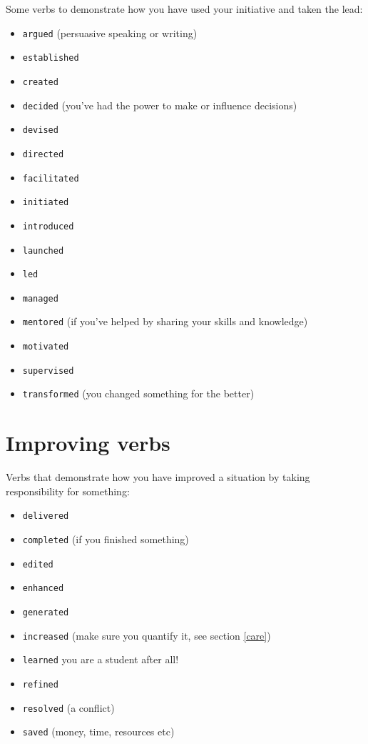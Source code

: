 \documentclass[
]{book}
\providecommand{\tightlist}{%
  \setlength{\itemsep}{0pt}\setlength{\parskip}{0pt}}
\begin{document}
Some verbs to demonstrate how you have used your initiative and taken the lead:

\begin{itemize}
\tightlist
\item
  \texttt{argued} (persuasive speaking or writing)
\item
  \texttt{established}
\item
  \texttt{created}
\item
  \texttt{decided} (you've had the power to make or influence decisions)
\item
  \texttt{devised}
\item
  \texttt{directed}
\item
  \texttt{facilitated}
\item
  \texttt{initiated}
\item
  \texttt{introduced}
\item
  \texttt{launched}
\item
  \texttt{led}
\item
  \texttt{managed}
\item
  \texttt{mentored} (if you've helped by sharing your skills and knowledge)
\item
  \texttt{motivated}
\item
  \texttt{supervised}
\item
  \texttt{transformed} (you changed something for the better)
\end{itemize}

\hypertarget{improving}{%
\section{Improving verbs}\label{improving}}

Verbs that demonstrate how you have improved a situation by taking responsibility for something:

\begin{itemize}
\tightlist
\item
  \texttt{delivered}
\item
  \texttt{completed} (if you finished something)
\item
  \texttt{edited}
\item
  \texttt{enhanced}
\item
  \texttt{generated}
\item
  \texttt{increased} (make sure you quantify it, see section \ref{care})
\item
  \texttt{learned} you are a student after all!
\item
  \texttt{refined}
\item
  \texttt{resolved} (a conflict)
\item
  \texttt{saved} (money, time, resources etc)
\end{itemize}
\end{document}

